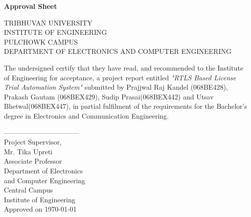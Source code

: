 
\begin{center}
	\begin{Large}
		\textbf{Approval Sheet}\\[1cm]
	\end{Large}
	\vfill
	TRIBHUVAN UNIVERSITY\\
	INSTITUTE OF ENGINEERING\\
	PULCHOWK CAMPUS\\
	DEPARTMENT OF ELECTRONICS AND COMPUTER ENGINEERING\\
\end{center}
The undersigned certify that they have read, and recommended to the Institute of Engineering for acceptance, a project report entitled \emph{"RTLS Based License Trial Automation System"}  submitted by Prajjwal Raj Kandel (068BE428), Prakash Gautam (068BEX429), Sudip Prasai(068BEX442) and Utsav Bhetwal(068BEX447), in partial fulfilment of the requirements for the Bachelor’s degree in Electronics and Communication Engineering.
\vfill
\begin{center}
---------------------------------\\
Project Supervisor, \\
Mr. Tika Upreti \\
Associate Professor \\
Department of Electronics \\
and Computer Engineering \\
Central Campus \\
Institute of Engineering \\
\vfill
Approved on \today
\end{center}
